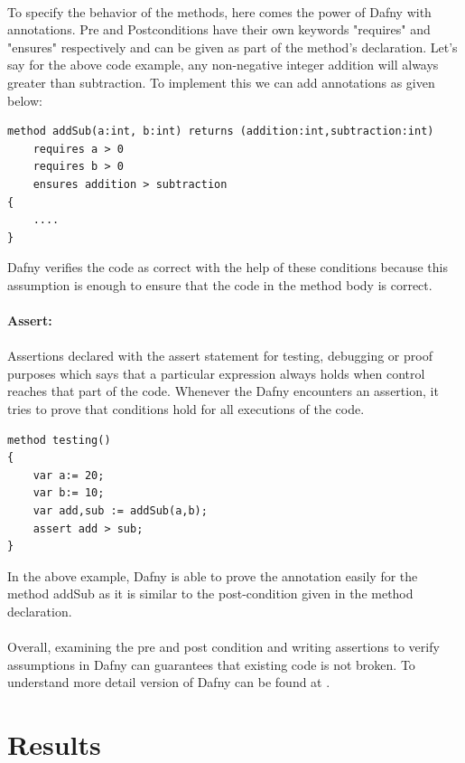 \documentclass[11pt]{article}
\begin{document}
\paragraph{}
To specify the behavior of the methods, here comes the power of Dafny with annotations. Pre and Postconditions have their own keywords "requires" and "ensures" respectively and can be given as part of the method's declaration. Let's say for the above code example, any non-negative integer addition will always greater than subtraction. To implement this we can add annotations as given below: \\
\begin{lstlisting}
method addSub(a:int, b:int) returns (addition:int,subtraction:int)
    requires a > 0
    requires b > 0
    ensures addition > subtraction
{
    ....
}
\end{lstlisting}
Dafny verifies the code as correct with the help of these conditions because this assumption is enough to ensure that the code in the method body is correct.\\ \\
\textbf{Assert: }
\paragraph{}
Assertions declared with the assert statement for testing, debugging or proof purposes which says that a particular expression always holds when control reaches that part of the code. Whenever the Dafny encounters an assertion, it tries to prove that conditions hold for all executions of the code. \\
\begin{lstlisting}
method testing()
{
    var a:= 20;
    var b:= 10;
    var add,sub := addSub(a,b);
    assert add > sub;
}
\end{lstlisting}
In the above example, Dafny is able to prove the annotation easily for the method addSub as it is similar to the post-condition given in the method declaration.
\paragraph{}
Overall, examining the pre and post condition and writing assertions to verify assumptions in Dafny can guarantees that existing code is not broken. To understand more detail version of Dafny can be found at \cite{rise4fun9:online}.


\section{Results}
\end{document}
